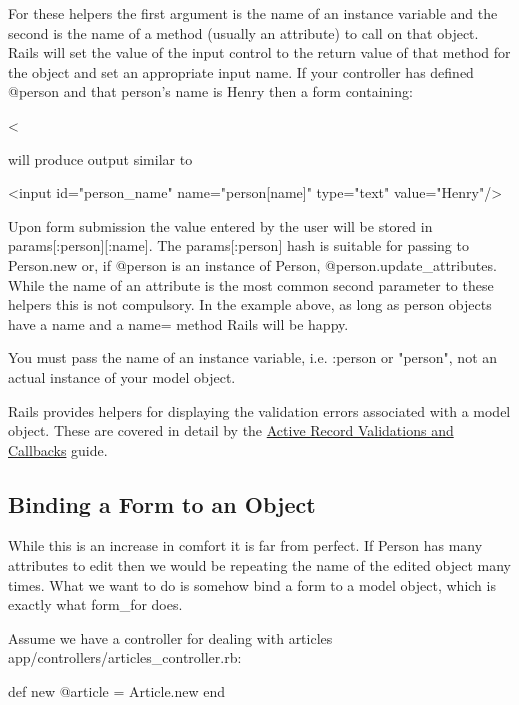 \documentclass[10pt]{book}
\newenvironment{code}{%
  \scriptsize
    \verbatim
}{%
    \endverbatim
    \newline
}
\begin{document}
For these helpers the first argument is the name of an instance  variable and the second is the name of a method (usually an attribute)  to call on that object. Rails will set the value of the input control to  the return value of that method for the object and set an appropriate  input name. If your controller has defined @person and that person’s name is Henry then a form containing:
\begin{code}
<%
\end{code}

will produce output similar to
\begin{code}
<input id="person_name" name="person[name]" type="text" value="Henry"/>
\end{code}

Upon form submission the value entered by the user will be stored in params[:person][:name]. The params[:person] hash is suitable for passing to Person.new or, if @person is an instance of Person, @person.update\_attributes.  While the name of an attribute is the most common second parameter to  these helpers this is not compulsory. In the example above, as long as  person objects have a name and a name= method Rails will be happy.

You must pass the name of an instance variable, i.e. :person or "person", not an actual instance of your model object.

Rails provides helpers for displaying the validation errors associated with a model object. These are covered in detail by the \href{http://guides.rubyonrails.org/active_record_validations_callbacks.html#displaying-validation-errors-in-the-view}{Active Record Validations and Callbacks} guide.

\subsection{ Binding a Form to an Object}

While this is an increase in comfort it is far from perfect. If  Person has many attributes to edit then we would be repeating the name  of the edited object many times. What we want to do is somehow bind a  form to a model object, which is exactly what form\_for does.

Assume we have a controller for dealing with articles \\ app/controllers/articles\_controller.rb:
\begin{code}
def new
  @article = Article.new
end
\end{code}
\end{document}
